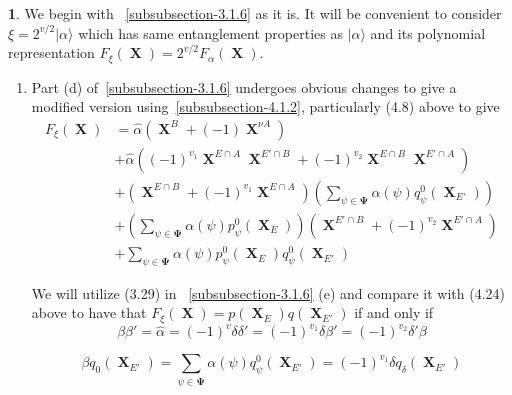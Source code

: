 \documentclass[a4paper,12pt]{article}
\DeclareMathOperator{\x}{\mathrm{X}}
\theoremstyle{definition}
\theoremstyle{underlinethm}
\theoremstyle{definition}
\newtheorem{subsubsec}{}[subsection]
\begin{document}
\begin{subsubsec}\label{subsubsection-4.3.1}
We begin with ~\eqref{subsubsection-3.1.6} as it is. It will be convenient to consider $\xi = 2^{v/2} | \alpha \rangle$ which has same entanglement properties as $| \alpha \rangle $ and its polynomial representation $F_{\xi}(\boldsymbol{\x}) =2^{v/2}F_{\alpha}(\boldsymbol{\x})$. 
\end{subsubsec}
\begin{enumerate}[label=(\alph*)]
\item Part (d) of~\eqref{subsubsection-3.1.6} undergoes obvious changes to give a modified version using~\eqref{subsubsection-4.1.2}, particularly (4.8) above to give
\begin{align*}
F_{\xi}(\boldsymbol{\x}) &= \hat{\alpha}\left(\boldsymbol{\x}^{B} + (-1) \boldsymbol{\x}^{\nu A}\right)\\
 & + \hat{\alpha}\left((-1)^{v_{1}} \boldsymbol{\x}^{E \cap A} \boldsymbol{\x}^{E' \cap B} + (-1)^{v_{2}} \boldsymbol{\x}^{E \cap B} \boldsymbol{\x}^{E' \cap A}\right)\\
 & + \left(\boldsymbol{\x}^{E \cap B} + (-1)^{v_{1}} \boldsymbol{\x}^{E \cap A}\right) \left(\sum_{\psi \in \boldsymbol{\Psi}} \alpha(\psi) q_{\psi}^{0} (\boldsymbol{\x}_{E'}) \right)\\
 & + \left(\sum_{\psi \in \boldsymbol{\Psi}} \alpha (\psi) p_{\psi}^{0} (\boldsymbol{\x}_{E}) \right) \left(\boldsymbol{\x}^{E' \cap B} + (-1)^{v_{2}} \boldsymbol{\x}^{E' \cap A} \right)\\
 & + \sum_{\psi \in \boldsymbol{\Psi}} \alpha(\psi) p_{\psi}^{0} (\boldsymbol{\x}_{E}) q_{\psi}^{0}(\boldsymbol{\x}_{E'})\tag{4.25}\label{eq-4.25}
\end{align*}

We will utilize (3.29) in ~\eqref{subsubsection-3.1.6} (e) and compare it with (4.24) above to have that $F_{\xi}(\boldsymbol{\x}) = p(\boldsymbol{\x}_{E}) q(\boldsymbol{\x}_{E'})$ if and only if 
\begin{equation}
\beta\beta' = \hat{\alpha} = (-1)^{v} \delta \delta' = (-1)^{v_{1}} \delta\beta' = (-1)^{v_{2}} \delta' \beta\tag{4.26}\label{eq-4.26}
\end{equation}

\begin{equation}
\beta q_{0} (\boldsymbol{\x}_{E'}) = \sum_{\psi \in \boldsymbol{\Psi}} \alpha (\psi) q_{\psi}^{0} (\boldsymbol{\x}_{E'}) = (-1)^{v_{1}} \delta q_{\delta} (\boldsymbol{\x}_{E'})\tag{4.27}\label{eq-4.27}
\end{equation}


\end{enumerate}
\end{document}
